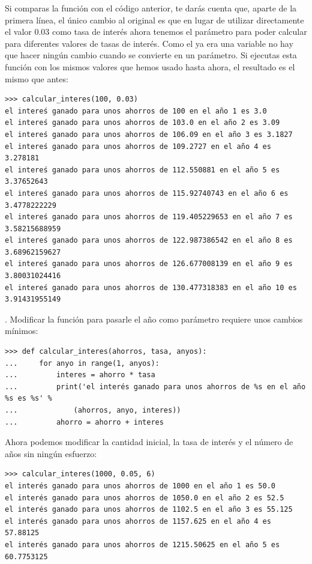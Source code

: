 Si comparas la función con el código anterior, te darás cuenta que, aparte de la primera línea, el único cambio al original es que en lugar de utilizar directamente el valor 0.03 como tasa de interés ahora tenemos el parámetro  para poder calcular para diferentes valores de tasas de interés.   Como el  ya era una variable no hay que hacer ningún cambio cuando se convierte en un parámetro.   Si ejecutas esta función con los mismos valores que hemos usado hasta ahora, el resultado es el mismo que antes:

\begin{listing}
\begin{verbatim}
>>> calcular_interes(100, 0.03)
el intereś ganado para unos ahorros de 100 en el año 1 es 3.0
el intereś ganado para unos ahorros de 103.0 en el año 2 es 3.09
el intereś ganado para unos ahorros de 106.09 en el año 3 es 3.1827
el intereś ganado para unos ahorros de 109.2727 en el año 4 es 3.278181
el intereś ganado para unos ahorros de 112.550881 en el año 5 es 3.37652643
el intereś ganado para unos ahorros de 115.92740743 en el año 6 es 3.4778222229
el intereś ganado para unos ahorros de 119.405229653 en el año 7 es 3.58215688959
el intereś ganado para unos ahorros de 122.987386542 en el año 8 es 3.68962159627
el intereś ganado para unos ahorros de 126.677008139 en el año 9 es 3.80031024416
el intereś ganado para unos ahorros de 130.477318383 en el año 10 es 3.91431955149
\end{verbatim}
\end{listing}

. Modificar la función para pasarle el año como parámetro requiere unos cambios mínimos:

\begin{listing}
\begin{verbatim}
>>> def calcular_interes(ahorros, tasa, anyos):
...     for anyo in range(1, anyos):
...         interes = ahorro * tasa
...         print('el interés ganado para unos ahorros de %s en el año %s es %s' % 
...             (ahorros, anyo, interes))
...         ahorro = ahorro + interes
\end{verbatim}
\end{listing}

\noindent
Ahora podemos modificar la cantidad inicial, la tasa de interés y el número de años sin ningún esfuerzo:

\begin{listing}
\begin{verbatim}
>>> calcular_interes(1000, 0.05, 6)
el interés ganado para unos ahorros de 1000 en el año 1 es 50.0
el interés ganado para unos ahorros de 1050.0 en el año 2 es 52.5
el interés ganado para unos ahorros de 1102.5 en el año 3 es 55.125
el interés ganado para unos ahorros de 1157.625 en el año 4 es 57.88125
el interés ganado para unos ahorros de 1215.50625 en el año 5 es 60.7753125
\end{verbatim}
\end{listing}

